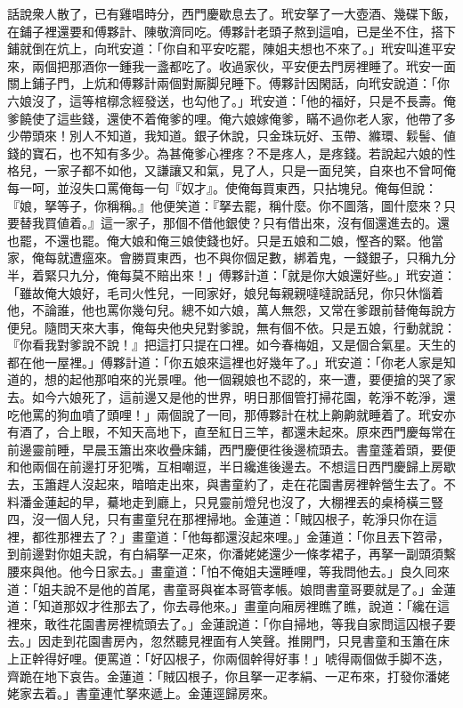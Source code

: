 話說衆人散了，已有雞唱時分，西門慶歇息去了。玳安拏了一大壺酒、幾碟下飯，在鋪子裡還要和傅夥計、陳敬濟同吃。傅夥計老頭子熬到這咱，已是坐不住，搭下鋪就倒在炕上，向玳安道：「你自和平安吃罷，陳姐夫想也不來了。」玳安叫進平安來，兩個把那酒你一鍾我一盞都吃了。收過家伙，平安便去門房裡睡了。玳安一面關上鋪子門，上炕和傅夥計兩個對厮脚兒睡下。傅夥計因閑話，向玳安說道：「你六娘沒了，這等棺槨念經發送，也勾他了。」玳安道：「他的福好，只是不長壽。俺爹饒使了這些錢，還使不着俺爹的哩。俺六娘嫁俺爹，瞞不過你老人家，他帶了多少帶頭來！別人不知道，我知道。銀子休說，只金珠玩好、玉帶、縧環、鬏髻、値錢的寶石，也不知有多少。為甚俺爹心裡疼？不是疼人，是疼錢。{}若說起六娘的性格兒，一家子都不如他，又謙讓又和氣，見了人，只是一面兒笑，自來也不曾呵俺每一呵，並沒失口罵俺每一句『奴才』。使俺每買東西，只拈塊兒。俺每但說：『娘，拏等子，你稱稱。』他便笑道：『拏去罷，稱什麼。你不圖落，圖什麼來？只要替我買値着。』這一家子，那個不借他銀使？只有借出來，沒有個還進去的。還也罷，不還也罷。俺大娘和俺三娘使錢也好。只是五娘和二娘，慳吝的緊。他當家，俺每就遭瘟來。會勝買東西，也不與你個足數，綁着鬼，一錢銀子，只稱九分半，着緊只九分，俺每莫不賠出來！」{}傅夥計道：「就是你大娘還好些。」玳安道：「雖故俺大娘好，毛司火性兒，一囘家好，娘兒每親親噠噠說話兒，你只休惱着他，不論誰，他也罵你幾句兒。{}總不如六娘，萬人無怨，又常在爹跟前替俺每說方便兒。隨問天來大事，俺每央他央兒對爹說，無有個不依。只是五娘，行動就說：『你看我對爹說不說！』把這打只提在口裡。如今春梅姐，又是個合氣星。天生的都在他一屋裡。」{}傅夥計道：「你五娘來這裡也好幾年了。」玳安道：「你老人家是知道的，想的起他那咱來的光景哩。{}他一個親娘也不認的，來一遭，要便搶的哭了家去。{}如今六娘死了，這前邊又是他的世界，明日那個管打掃花園，乾淨不乾淨，還吃他罵的狗血噴了頭哩！」兩個說了一囘，那傅夥計在枕上齁齁就睡着了。{}玳安亦有酒了，合上眼，不知天高地下，直至紅日三竿，都還未起來。原來西門慶每常在前邊靈前睡，早晨玉簫出來收疊床鋪，西門慶便徃後邊梳頭去。書童蓬着頭，要便和他兩個在前邊打牙犯嘴，互相嘲逗，半日纔進後邊去。不想這日西門慶歸上房歇去，玉簫趕人沒起來，暗暗走出來，與書童約了，走在花園書房裡幹營生去了。不料潘金蓮起的早，驀地走到廳上，只見靈前燈兒也沒了，大棚裡丟的桌椅橫三豎四，沒一個人兒，{}只有畫童兒在那裡掃地。金蓮道：「賊囚根子，乾淨只你在這裡，都徃那裡去了？」畫童道：「他每都還沒起來哩。」金蓮道：「你且丟下笤帚，到前邊對你姐夫說，有白絹拏一疋來，你潘姥姥還少一條孝裙子，再拏一副頭須繫腰來與他。他今日家去。」畫童道：「怕不俺姐夫還睡哩，等我問他去。」良久囘來道：「姐夫說不是他的首尾，書童哥與崔本哥管孝帳。娘問書童哥要就是了。」金蓮道：「知道那奴才徃那去了，你去尋他來。」畫童向廂房裡瞧了瞧，{}說道：「纔在這裡來，敢徃花園書房裡梳頭去了。」金蓮說道：「你自掃地，等我自家問這囚根子要去。」因走到花園書房內，忽然聽見裡面有人笑聲。推開門，只見書童和玉簫在床上正幹得好哩。便罵道：「好囚根子，你兩個幹得好事！」唬得兩個做手脚不迭，齊跪在地下哀告。金蓮道：「賊囚根子，你且拏一疋孝絹、一疋布來，打發你潘姥姥家去着。」書童連忙拏來遞上。金蓮逕歸房來。

